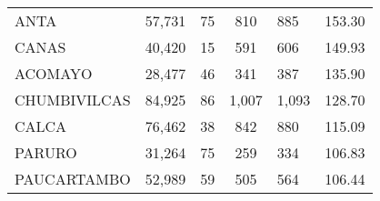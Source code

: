 \begin{tabular}{lrcclr}
	\cellcolor[HTML]{FFFF99}ANTA                                   & 57,731                                                         & 75                                                         & 810                  & 885                                                                 & 153.30                                                                       \\
	\cellcolor[HTML]{FFFF99}CANAS                                  & 40,420                                                         & 15                                                         & 591                  & 606                                                                 & 149.93                                                                       \\
	\cellcolor[HTML]{C6E0B4}ACOMAYO                                & 28,477                                                         & 46                                                         & 341                  & 387                                                                 & 135.90                                                                       \\
	\cellcolor[HTML]{C6E0B4}CHUMBIVILCAS                           & 84,925                                                         & 86                                                         & 1,007                & 1,093                                                               & 128.70                                                                       \\
	\cellcolor[HTML]{C6E0B4}CALCA                                  & 76,462                                                         & 38                                                         & 842                  & 880                                                                 & 115.09                                                                       \\
	\cellcolor[HTML]{C6E0B4}PARURO                                 & 31,264                                                         & 75                                                         & 259                  & 334                                                                 & 106.83                                                                       \\
	\cellcolor[HTML]{C6E0B4}PAUCARTAMBO                            & 52,989                                                         & 59                                                         & 505                  & 564                                                                 & 106.44                                                                       \\

\end{tabular}
